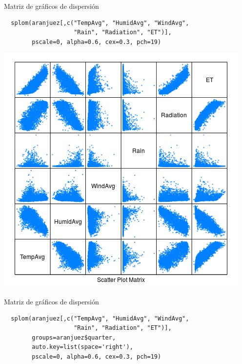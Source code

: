 \documentclass[xcolor={usenames,svgnames,dvipsnames}]{beamer}
\begin{document}
\begin{frame}[fragile,label=sec-6-1-20]{Matriz de gráficos de dispersión}
 \lstset{language=R,label= ,caption= ,numbers=none}
\begin{lstlisting}
  splom(aranjuez[,c("TempAvg", "HumidAvg", "WindAvg",
                    "Rain", "Radiation", "ET")],
        pscale=0, alpha=0.6, cex=0.3, pch=19)
\end{lstlisting}
\end{frame}

\begin{frame}[label=sec-6-1-21]{}
\includegraphics[width=.9\linewidth]{figs/splom.png}
\end{frame}

\begin{frame}[fragile,label=sec-6-1-22]{Matriz de gráficos de dispersión}
 \lstset{language=R,label= ,caption= ,numbers=none}
\begin{lstlisting}
  splom(aranjuez[,c("TempAvg", "HumidAvg", "WindAvg",
                    "Rain", "Radiation", "ET")],
        groups=aranjuez$quarter,
        auto.key=list(space='right'),
        pscale=0, alpha=0.6, cex=0.3, pch=19)
\end{lstlisting}
\end{frame}
\end{document}

